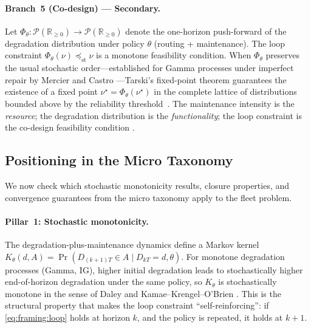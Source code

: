 \documentclass[11pt,a4paper]{article}
\theoremstyle{plain}
\theoremstyle{definition}
\theoremstyle{remark}
\begin{document}
\paragraph{Branch~5 (Co-design) --- Secondary.}
Let $\Phi_\theta : \mathcal{P}(\mathbb{R}_{\ge 0}) \to \mathcal{P}(\mathbb{R}_{\ge 0})$
denote the one-horizon push-forward of the degradation distribution under policy
$\theta$ (routing + maintenance). The loop constraint $\Phi_\theta(\nu) \preceq_{\mathrm{st}} \nu$
is a monotone feasibility condition. When $\Phi_\theta$ preserves the usual stochastic
order---established for Gamma processes under imperfect repair by Mercier and
Castro \cite{mercier2019}---Tarski's fixed-point theorem guarantees the existence
of a fixed point $\nu^\star = \Phi_\theta(\nu^\star)$ in the complete lattice of
distributions bounded above by the reliability threshold~\cite[Thm.~2.5.1]{topkis1998}.
The maintenance intensity is the \emph{resource}; the degradation distribution is the
\emph{functionality}; the loop constraint is the co-design feasibility
condition \cite{censi2015}.

\subsection{Positioning in the Micro Taxonomy}
\label{sec:framing:micro}

We now check which stochastic monotonicity results, closure properties, and
convergence guarantees from the micro taxonomy apply to the fleet problem.

\paragraph{Pillar~1: Stochastic monotonicity.}
The degradation-plus-maintenance dynamics define a Markov kernel
$K_\theta(d, A) = \Pr(D_{(k+1)T} \in A \mid D_{kT} = d, \theta)$.
For monotone degradation processes (Gamma, IG), higher initial degradation
leads to stochastically higher end-of-horizon degradation under the same policy,
so $K_\theta$ is stochastically monotone in the sense of Daley \cite{daley1968}
and Kamae--Krengel--O'Brien \cite{kamae1977}. This is the structural property that
makes the loop constraint ``self-reinforcing'': if \eqref{eq:framing:loop} holds
at horizon $k$, and the policy is repeated, it holds at $k+1$.
\end{document}
